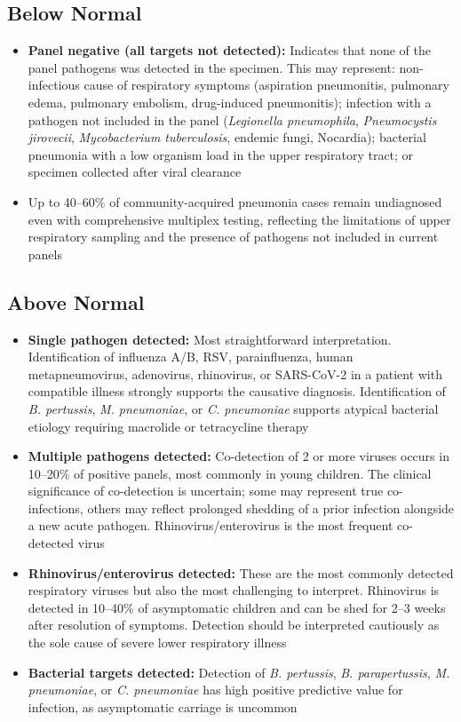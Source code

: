 \subsection*{Below Normal}
\begin{itemize}
  \item \textbf{Panel negative (all targets not detected):} Indicates that none of the panel pathogens was detected in the specimen. This may represent: non-infectious cause of respiratory symptoms (aspiration pneumonitis, pulmonary edema, pulmonary embolism, drug-induced pneumonitis); infection with a pathogen not included in the panel (\textit{Legionella pneumophila}, \textit{Pneumocystis jirovecii}, \textit{Mycobacterium tuberculosis}, endemic fungi, Nocardia); bacterial pneumonia with a low organism load in the upper respiratory tract; or specimen collected after viral clearance
  \item Up to 40--60\% of community-acquired pneumonia cases remain undiagnosed even with comprehensive multiplex testing, reflecting the limitations of upper respiratory sampling and the presence of pathogens not included in current panels
\end{itemize}

\subsection*{Above Normal}
\begin{itemize}
  \item \textbf{Single pathogen detected:} Most straightforward interpretation. Identification of influenza A/B, RSV, parainfluenza, human metapneumovirus, adenovirus, rhinovirus, or SARS-CoV-2 in a patient with compatible illness strongly supports the causative diagnosis. Identification of \textit{B. pertussis}, \textit{M. pneumoniae}, or \textit{C. pneumoniae} supports atypical bacterial etiology requiring macrolide or tetracycline therapy
  \item \textbf{Multiple pathogens detected:} Co-detection of 2 or more viruses occurs in 10--20\% of positive panels, most commonly in young children. The clinical significance of co-detection is uncertain; some may represent true co-infections, others may reflect prolonged shedding of a prior infection alongside a new acute pathogen. Rhinovirus/enterovirus is the most frequent co-detected virus
  \item \textbf{Rhinovirus/enterovirus detected:} These are the most commonly detected respiratory viruses but also the most challenging to interpret. Rhinovirus is detected in 10--40\% of asymptomatic children and can be shed for 2--3 weeks after resolution of symptoms. Detection should be interpreted cautiously as the sole cause of severe lower respiratory illness
  \item \textbf{Bacterial targets detected:} Detection of \textit{B. pertussis}, \textit{B. parapertussis}, \textit{M. pneumoniae}, or \textit{C. pneumoniae} has high positive predictive value for infection, as asymptomatic carriage is uncommon
\end{itemize}

